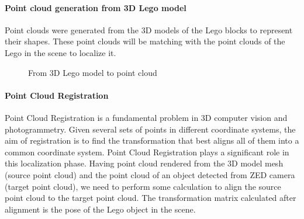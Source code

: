\documentclass{article}
\begin{document}
	\begin{figure}[H]
		\centering
		\label{fig:pointcloud-clean}
	\end{figure}
	
	\paragraph{Point cloud generation from 3D Lego model}
	Point clouds were generated from the 3D models of the Lego blocks to represent their shapes. These point clouds will be matching with the point clouds of the Lego in the scene to localize it.
	
	\begin{figure}[H]
		\centering
		\caption{From 3D Lego model to point cloud}
		\label{fig:pointcloud-from-3d}
	\end{figure}
	
	\paragraph{Point Cloud Registration}
	Point Cloud Registration is a fundamental problem in 3D computer vision and photogrammetry. Given several sets of points in different coordinate systems, the aim of registration is to find the transformation that best aligns all of them into a common coordinate system. Point Cloud Registration plays a significant role in this localization phase. Having point cloud rendered from the 3D model mesh (source point cloud) and the point cloud of an object detected from ZED camera (target point cloud), we need to perform some calculation to align the source point cloud to the target point cloud. The transformation matrix calculated after alignment is the pose of the Lego object in the scene.
	
\end{document}
